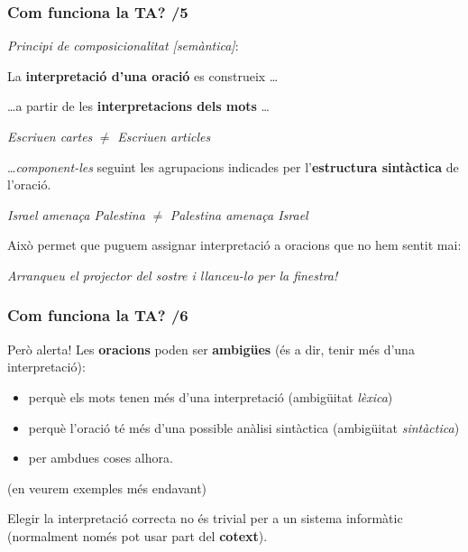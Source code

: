 \documentclass{beamer}
\newcommand{\empha}[1]{\emph{#1}\/}
\begin{document}
\begin{frame}
\frametitle{ Com funciona la TA? /5}

\empha{Principi de composicionalitat [semàntica]}:


{
{La \textbf{interpretació d'una oració} es construeix \ldots}

\pause

{\ldots a partir de les \textbf{interpretacions dels
    mots} \ldots}

\pause
{\begin{center}\textit{Escriuen \empha{cartes}} $\neq$ \textit{Escriuen \empha{articles}}\end{center}}

\pause
{\ldots \empha{component-les} seguint les agrupacions indicades 
per l'\textbf{estructura sintàctica} de
  l'oració.}
\pause
{\begin{center} \textit{Israel amenaça Palestina} $\neq$ \textit{Palestina amenaça Israel} \end{center}}
\pause
Això permet que puguem assignar interpretació a oracions que no hem sentit mai:

\pause
{\begin{center} \textit{Arranqueu el projector del sostre i llanceu-lo per la finestra!} \end{center}}

}

\end{frame}


\begin{frame}
\frametitle{Com funciona la TA? /6}

Però alerta!  Les \textbf{oracions} poden ser \textbf{ambigües} (\'es
a dir, tenir m\'es d'una interpretaci\'o):

\begin{itemize}
\item perqu\`e els mots tenen m\'es d'una interpretaci\'{o}
  (ambig\"uitat \empha{l\`exica})
 

\item perqu\`{e} l'oraci\'{o} t\'{e} m\'{e}s d'una possible an\`alisi
  sint\`actica (ambig\"uitat \empha{sint\`actica})

\item per ambdues coses alhora.
\end{itemize}
(en veurem exemples més endavant)

Elegir la interpretaci\'{o} correcta no \'es trivial per a un sistema
  inform\`atic (normalment només pot usar part del \textbf{cotext}).


\end{frame} 
\end{document}
